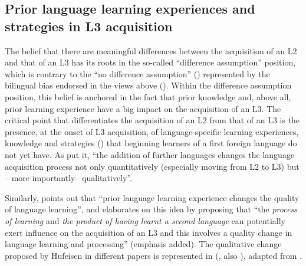 \documentclass[output=paper,colorlinks,citecolor=brown,nonflat]{../langscibook}
\begin{document}
\subsection{Prior language learning experiences and strategies in L3 acquisition}\label{sec:sanchez1:1.1}

The belief that there are meaningful differences between the acquisition of an L2 and that of an L3 has its roots in the so-called “difference assumption” position, which is contrary to the “no difference assumption” (\citealt{DeAngelis2007}) represented by the bilingual bias endorsed in the views above (\citealt{SharwoodSmith1994, MitchellMyles1998, Grosjean2010}). Within the difference assumption position, this belief is anchored in the fact that prior knowledge and, above all, prior learning experience have a big impact on the acquisition of an L3. The critical point that differentiates the acquisition of an L2 from that of an L3 is the presence, at the onset of L3 acquisition, of language-specific learning experiences, knowledge and strategies (\citealt{GibsonHufeisen2003}) that beginning learners of a first foreign language do not yet have. As \citet[145]{MarxHufeisen2004} put it, “the addition of further languages changes the language acquisition process not only quantitatively (especially moving from L2 to L3) but – more importantly– qualitatively”.

Similarly, \citet[207]{Jessner1999} points out that “prior language learning experience changes the quality of language learning”, and \citet[14]{Jessner2006} elaborates on this idea by proposing that “the \textit{process of learning} and \textit{the product of having learnt a second language} can potentially exert influence on the acquisition of an L3 and this involves a quality change in language learning and processing” (emphasis added). The qualitative change proposed by Hufeisen in different papers is represented in  (\citealt{Hufeisen1998}, also \citealt[145]{MarxHufeisen2004}), adapted from \citet[314]{HufeisenMarx2007}.


\end{document}
